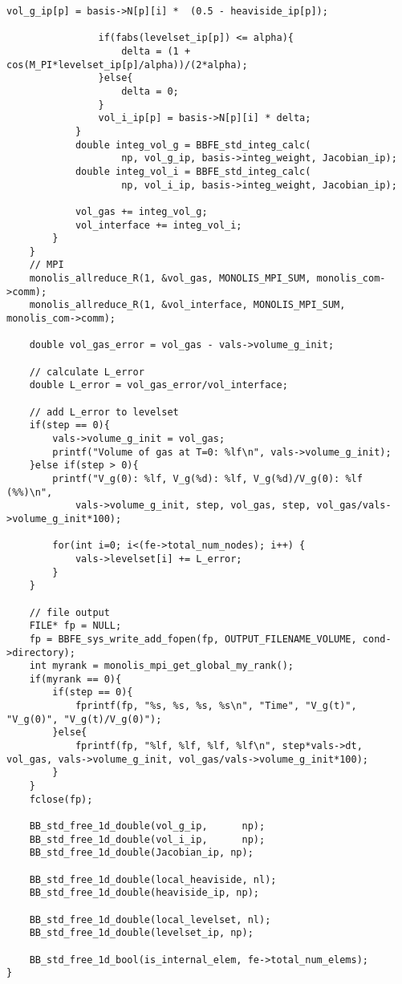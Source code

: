 \begin{lstlisting}[caption = mlflow\_fs\_sups.cにおける体積補正の計算]
				vol_g_ip[p] = basis->N[p][i] *  (0.5 - heaviside_ip[p]);

				if(fabs(levelset_ip[p]) <= alpha){
					delta = (1 + cos(M_PI*levelset_ip[p]/alpha))/(2*alpha);
				}else{
					delta = 0;
				}
				vol_i_ip[p] = basis->N[p][i] * delta;
			}
			double integ_vol_g = BBFE_std_integ_calc(
					np, vol_g_ip, basis->integ_weight, Jacobian_ip);
			double integ_vol_i = BBFE_std_integ_calc(
					np, vol_i_ip, basis->integ_weight, Jacobian_ip);

			vol_gas += integ_vol_g;
			vol_interface += integ_vol_i;
		}
	}
	// MPI
	monolis_allreduce_R(1, &vol_gas, MONOLIS_MPI_SUM, monolis_com->comm);
	monolis_allreduce_R(1, &vol_interface, MONOLIS_MPI_SUM, monolis_com->comm);

	double vol_gas_error = vol_gas - vals->volume_g_init;

	// calculate L_error
	double L_error = vol_gas_error/vol_interface;

	// add L_error to levelset
	if(step == 0){
		vals->volume_g_init = vol_gas;
		printf("Volume of gas at T=0: %lf\n", vals->volume_g_init);
	}else if(step > 0){
		printf("V_g(0): %lf, V_g(%d): %lf, V_g(%d)/V_g(0): %lf (%%)\n", 
			vals->volume_g_init, step, vol_gas, step, vol_gas/vals->volume_g_init*100);

		for(int i=0; i<(fe->total_num_nodes); i++) {
			vals->levelset[i] += L_error;
		}
	}

	// file output
	FILE* fp = NULL;
	fp = BBFE_sys_write_add_fopen(fp, OUTPUT_FILENAME_VOLUME, cond->directory);
	int myrank = monolis_mpi_get_global_my_rank();
	if(myrank == 0){
		if(step == 0){
			fprintf(fp, "%s, %s, %s, %s\n", "Time", "V_g(t)", "V_g(0)", "V_g(t)/V_g(0)");
		}else{
			fprintf(fp, "%lf, %lf, %lf, %lf\n", step*vals->dt, vol_gas, vals->volume_g_init, vol_gas/vals->volume_g_init*100);
		}
	}
	fclose(fp);

	BB_std_free_1d_double(vol_g_ip,      np);
	BB_std_free_1d_double(vol_i_ip,      np);
	BB_std_free_1d_double(Jacobian_ip, np);

	BB_std_free_1d_double(local_heaviside, nl);
	BB_std_free_1d_double(heaviside_ip, np);

	BB_std_free_1d_double(local_levelset, nl);
	BB_std_free_1d_double(levelset_ip, np);

	BB_std_free_1d_bool(is_internal_elem, fe->total_num_elems);
}
\end{lstlisting}

